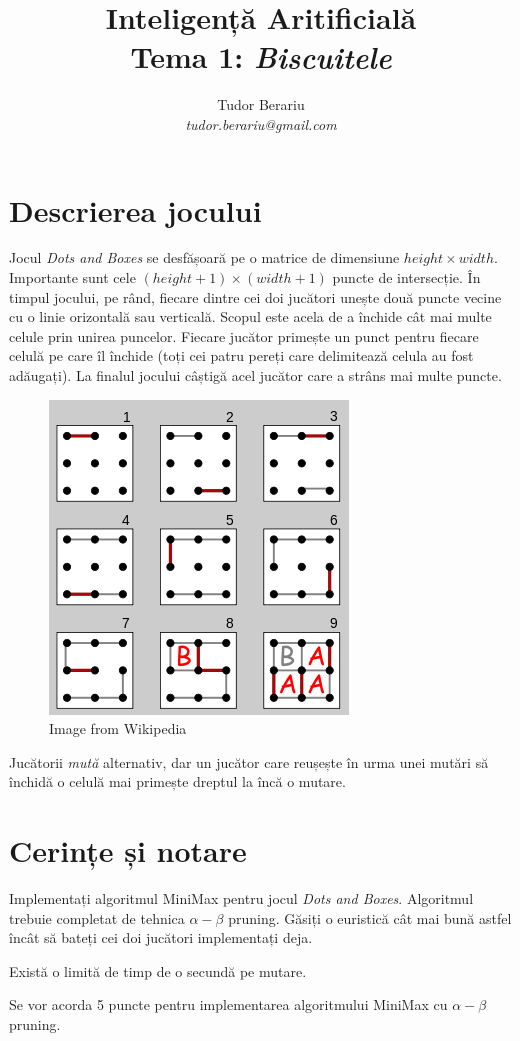 \documentclass[12pt]{article}
\title{Inteligență Aritificială \\ Tema 1: \emph{Biscuitele}}
\author{Tudor Berariu \\ \emph{tudor.berariu@gmail.com}}
\begin{document}
\maketitle

\section{Descrierea jocului}
\label{sec:desc}

Jocul \emph{Dots and Boxes} se desfășoară pe o matrice de dimensiune
$height \times width$. Importante sunt cele $(height+1) \times
(width+1)$ puncte de intersecție. În timpul jocului, pe rând, fiecare
dintre cei doi jucători unește două puncte vecine cu o linie
orizontală sau verticală. Scopul este acela de a închide cât mai multe
celule prin unirea puncelor. Fiecare jucător primește un punct pentru
fiecare celulă pe care îl închide (toți cei patru pereți care
delimitează celula au fost adăugați). La finalul jocului câștigă acel
jucător care a strâns mai multe puncte.

\begin{figure}[h]
  \centering
  \includegraphics[width=.3\textwidth]{dots.png}
  \caption{Image from Wikipedia}
\end{figure}

Jucătorii \emph{mută} alternativ, dar un jucător care reușește în urma
unei mutări să închidă o celulă mai primește dreptul la încă o mutare.



\section{Cerințe și notare}
\label{sec:tasks}

Implementați algoritmul MiniMax pentru jocul \emph{Dots and
  Boxes}. Algoritmul trebuie completat de tehnica $\alpha-\beta$
pruning. Găsiți o euristică cât mai bună astfel încât să bateți cei
doi jucători implementați deja.

Există o limită de timp de o secundă pe mutare.

Se vor acorda 5 puncte pentru implementarea algoritmului MiniMax cu
$\alpha-\beta$ pruning.
\end{document}
